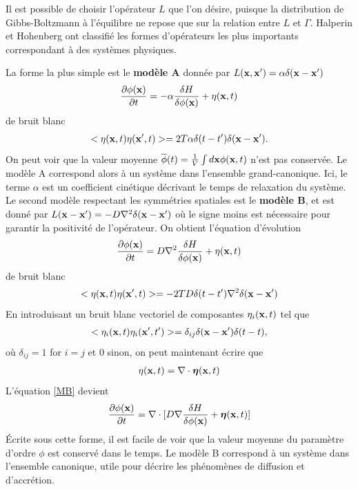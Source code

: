 Il est possible de choisir l'opérateur $L$ que l'on désire, puisque la distribution de Gibbs-Boltzmann à l'équilibre ne repose que sur la relation entre $L$ et $\Gamma$. 
Halperin et Hohenberg \cite{hohenberg_theory_1977} ont classifié les formes d'opérateurs les plus importants correspondant à des systèmes physiques.

La forme la plus simple est le \textbf{modèle A} donnée par $L({\bf x},{\bf x}')=\alpha\delta({\bf x}-{\bf x}')$ 
\begin{align}
    \frac{\partial \phi({\bf x})}{\partial t}= -\alpha \frac{\delta H}{\delta \phi({\bf x})} + \eta({\bf x},t)
    \label{MA}
\end{align}
de bruit blanc
\begin{align}
    < \eta({\bf x},t)\eta({\bf x}',t)> =2T \alpha \delta(t-t')\delta({\bf x}-{\bf x}').
\end{align}
On peut voir que la valeur moyenne $\overline \phi(t) = \frac{1}{V}\int d{\bf x} \phi({\bf x},t)$ n'est pas conservée. Le modèle A correspond alors à un système dans l'ensemble grand-canonique. Ici, le terme $\alpha$ est un coefficient cinétique décrivant le temps de relaxation du système. 
Le second modèle respectant les symmétries spatiales est le \textbf{modèle B}, et est donné par $L({\bf x}-{\bf x}')= -D\nabla^2 \delta({\bf x}-{\bf x'})$ où le signe moins est nécessaire pour garantir la positivité de l'opérateur. On obtient l'équation d'évolution
\begin{align}
    \frac{\partial \phi({\bf x})}{\partial t}= D\nabla^2 \frac{\delta H}{\delta \phi({\bf x})} + \eta({\bf x},t)
    \label{MB}
\end{align}
de bruit blanc
\begin{align}
    <\eta({\bf x},t)\eta({\bf x}',t)> =-2TD   \delta(t-t')\nabla^2\delta({\bf x}-{\bf x}')
\end{align}
En introduisant un bruit blanc vectoriel de composantes $\eta_i({\bf x},t)$ tel que 
\begin{align}
    < \eta_i({\bf x},t) \eta_i({\bf x}',t')> =\delta_{ij} \delta({\bf x}-{\bf x}')\delta(t-t),
\end{align}
où $\delta_{ij}=1$ for $i=j$ et $0$ sinon, on peut maintenant écrire que 
\begin{align}
    \eta({\bf x},t)= \nabla\cdot {\boldsymbol \eta}({\bf x},t)
\end{align}
L'équation \ref{MB} devient 
\begin{align}
    \frac{\partial \phi({\bf x})}{\partial t}= \nabla\cdot[ D\nabla \frac{\delta H}{\delta \phi({\bf x})} + {\boldsymbol\eta}({\bf x},t)]
\end{align}
Écrite sous cette forme, il est facile de voir que la valeur moyenne du paramètre d'ordre $\phi$ est conservé dans le temps. Le modèle B correspond à un système dans l'ensemble canonique, utile pour décrire les phénomènes de diffusion et d'accrétion.

